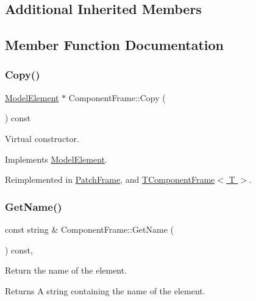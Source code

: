\subsection*{Additional Inherited Members}


\subsection{Member Function Documentation}
\mbox{\label{classComponentFrame_a24f6aea39b57e4b10a764877d1be6b7f}} 
\subsubsection{\texorpdfstring{Copy()}{Copy()}}
{\footnotesize\ttfamily \hyperlink{classModelElement}{Model\+Element} $\ast$ Component\+Frame\+::\+Copy (\begin{DoxyParamCaption}{ }\end{DoxyParamCaption}) const\hspace{0.3cm}{\ttfamily [virtual]}}

Virtual constructor. 

Implements \hyperlink{classModelElement_ac3ca26d649bd86a0f31a58ae09941429}{Model\+Element}.



Reimplemented in \hyperlink{classPatchFrame_a4103f544750beb79b95795c6be388c1d}{Patch\+Frame}, and \hyperlink{classTComponentFrame_a83b3faa024200e7d628451e1f8b50900}{T\+Component\+Frame$<$ T $>$}.

\mbox{\label{classComponentFrame_a32bc80a48e64f286ee07519e17220248}} 
\subsubsection{\texorpdfstring{Get\+Name()}{GetName()}}
{\footnotesize\ttfamily const string \& Component\+Frame\+::\+Get\+Name (\begin{DoxyParamCaption}{ }\end{DoxyParamCaption}) const\hspace{0.3cm}{\ttfamily [inline]}, {\ttfamily [virtual]}}

Return the name of the element. \begin{DoxyReturn}{Returns}
A string containing the name of the element. 
\end{DoxyReturn}


